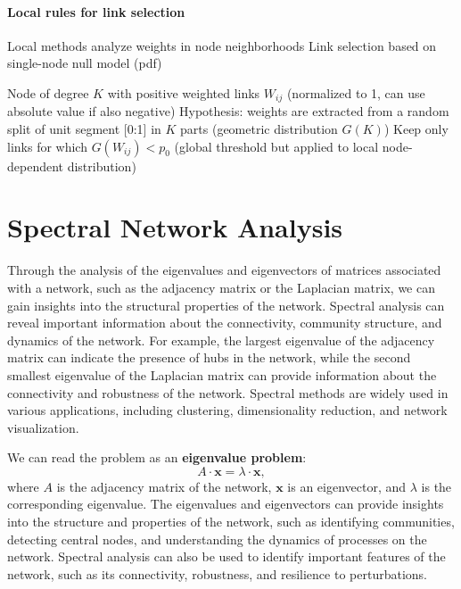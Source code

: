\paragraph{Local rules for link selection}

Local methods analyze weights in node neighborhoods
Link selection based on single-node null model (pdf)

\begin{example}
\end{example}

Node of degree \(K\) with positive weighted links \(W_{ij}\) (normalized to 1, can use absolute value if also negative)
Hypothesis: weights are extracted from a random split of unit segment [0:1] in \(K\) parts (geometric distribution \(G(K)\))
Keep only links for which \(G(W_{ij} ) < p_0\) (global threshold but applied to local node-dependent distribution)

\section{Spectral Network Analysis}

Through the analysis of the eigenvalues and eigenvectors of matrices associated with a network, such as the adjacency matrix or the Laplacian matrix, we can gain insights into the structural properties of the network. Spectral analysis can reveal important information about the connectivity, community structure, and dynamics of the network. For example, the largest eigenvalue of the adjacency matrix can indicate the presence of hubs in the network, while the second smallest eigenvalue of the Laplacian matrix can provide information about the connectivity and robustness of the network. Spectral methods are widely used in various applications, including clustering, dimensionality reduction, and network visualization.

We can read the problem as an \textbf{eigenvalue problem}:
\[
    A \cdot \mathbf{x} = \lambda \cdot \mathbf{x},
\]
where \(A\) is the adjacency matrix of the network, \(\mathbf{x}\) is an eigenvector, and \(\lambda\) is the corresponding eigenvalue. The eigenvalues and eigenvectors can provide insights into the structure and properties of the network, such as identifying communities, detecting central nodes, and understanding the dynamics of processes on the network. Spectral analysis can also be used to identify important features of the network, such as its connectivity, robustness, and resilience to perturbations.

